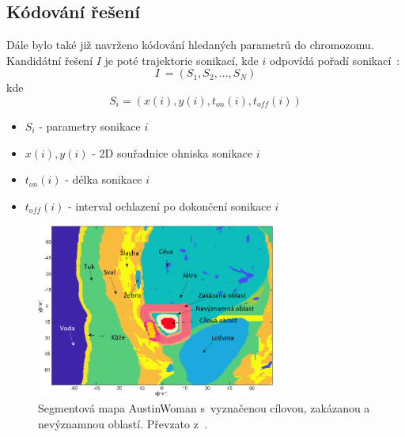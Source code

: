 \subsection*{Kódování řešení}

Dále bylo také již navrženo kódování hledaných parametrů do chromozomu. Kandidátní řešení $I$ je poté trajektorie sonikací, kde $i$ odpovídá pořadí sonikací~\cite{FITPUB11696}: 
\begin{equation}
    \label{eq:trajectory}
     I~= (S_{1}, S_{2}, ..., S_{N})
\end{equation}kde
\begin{equation}
    \label{eq:S}
     S_{i} = (x(i), y(i), t_{on}(i), t_{off}(i)) 
\end{equation}
\begin{itemize}
    \item $S_i$ - parametry sonikace $i$
    \item $x(i), y(i)$ - 2D souřadnice ohniska sonikace $i$
    \item $t_{on}(i)$ - délka sonikace $i$
    \item $t_{off}(i)$ - interval ochlazení po dokončení sonikace $i$
\end{itemize}

\begin{figure}[hbt]
	\centering
	\includegraphics[width=0.7\textwidth]{obrazky-figures/austinWoman.png}
	\caption{Segmentová mapa AustinWoman s~vyznačenou cílovou, zakázanou a nevýznamnou oblastí. Převzato z~\cite{FITPUB11696}.}
	\label{fg:austinWoman}
\end{figure}


